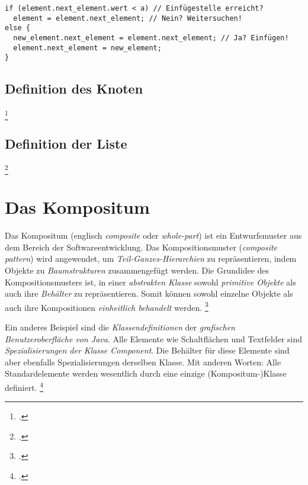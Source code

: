 \documentclass{lehramt-informatik-haupt}
\begin{document}
\begin{verbatim}
if (element.next_element.wert < a) // Einfügestelle erreicht?
  element = element.next_element; // Nein? Weitersuchen!
else {
  new_element.next_element = element.next_element; // Ja? Einfügen!
  element.next_element = new_element;
}
\end{verbatim}

%

\subsection{Definition des Knoten}

\footcite[Seite 326]{saake}

%

\subsection{Definition der Liste}

\footcite[Seite 327-329]{saake}

%

\section{Das Kompositum}

Das Kompositum (englisch \emph{composite} oder \emph{whole-part}) ist
ein Entwurfsmuster aus dem Bereich der Softwareentwicklung. Das
Kompositionsmuster (\emph{composite pattern}) wird angewendet, um
\emph{Teil-Ganzes-Hierarchien} zu repräsentieren, indem Objekte zu
\emph{Baumstrukturen} zusammengefügt werden. Die Grundidee des
Kompositionsmusters ist, in einer \emph{abstrakten Klasse} sowohl
\emph{primitive Objekte} als auch ihre \emph{Behälter} zu
repräsentieren. Somit können sowohl einzelne Objekte als auch ihre
Kompositionen \emph{einheitlich behandelt} werden.
\footcite{aud:fs:4}

Ein anderes Beispiel sind die \emph{Klassendefinitionen} der
\emph{grafischen Benutzeroberfläche von Java}. Alle Elemente wie
Schaltflächen und Textfelder sind \emph{Spezialisierungen der Klasse
Component}. Die Behälter für diese Elemente sind aber ebenfalls
Spezialisierungen derselben Klasse. Mit anderen Worten: Alle
Standardelemente werden wesentlich durch eine einzige
(Kompositum-)Klasse definiert.
\footcite{wiki:kompositum}
\end{document}
